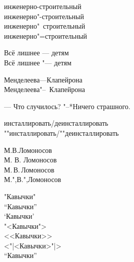 ﻿\documentclass{article}
\begin{document}
\begin{boxedminipage}{1.8cm}
инженерно-строительный\\
инженерно"-строительный\\
инженерно"~строительный\\
инженерно"=строительный
\end{boxedminipage}

\begin{boxedminipage}{2.2cm}
Всё лишнее --- детям\\
Всё лишнее "--- детям
\end{boxedminipage}

\begin{boxedminipage}{2cm}
Менделеева---Клапейрона\\
Менделеева"--~Клапейрона
\end{boxedminipage}

\begin{boxedminipage}{2.2cm}
--- Что случилось?
"--*Ничего страшного.
\end{boxedminipage}

\begin{boxedminipage}{2.2cm}
инсталлировать/деинсталлировать\\
""инсталлировать/""деинсталлировать
\end{boxedminipage}

\begin{boxedminipage}{2cm}
М.В.Ломоносов\\
М. В. Ломоносов\\
М.\,В.\,Ломоносов\\
М.",В.",Ломоносов
\end{boxedminipage}

\begin{boxedminipage}{3cm}
"Кавычки"\\
``Кавычки''\\
`Кавычки'\\
"<Кавычки">\\
<<Кавычки>>\\
<"|<Кавычки>"|>\\
"`Кавычки"'
\end{boxedminipage}
\end{document}
